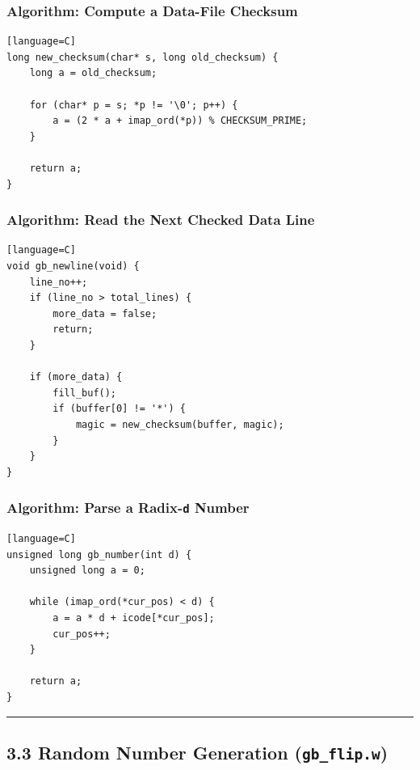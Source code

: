\documentclass[11pt]{article}
\begin{document}
\subsubsection{Algorithm: Compute a Data-File Checksum}\label{algorithm-compute-a-data-file-checksum}

\begin{verbatim}[language=C]
long new_checksum(char* s, long old_checksum) {
    long a = old_checksum;

    for (char* p = s; *p != '\0'; p++) {
        a = (2 * a + imap_ord(*p)) % CHECKSUM_PRIME;
    }

    return a;
}
\end{verbatim}

\subsubsection{Algorithm: Read the Next Checked Data Line}\label{algorithm-read-the-next-checked-data-line}

\begin{verbatim}[language=C]
void gb_newline(void) {
    line_no++;
    if (line_no > total_lines) {
        more_data = false;
        return;
    }

    if (more_data) {
        fill_buf();
        if (buffer[0] != '*') {
            magic = new_checksum(buffer, magic);
        }
    }
}
\end{verbatim}

\subsubsection{\texorpdfstring{Algorithm: Parse a Radix-\texttt{d} Number}{Algorithm: Parse a Radix-d Number}}\label{algorithm-parse-a-radix-d-number}

\begin{verbatim}[language=C]
unsigned long gb_number(int d) {
    unsigned long a = 0;

    while (imap_ord(*cur_pos) < d) {
        a = a * d + icode[*cur_pos];
        cur_pos++;
    }

    return a;
}
\end{verbatim}

\begin{center}\rule{0.5\linewidth}{0.5pt}\end{center}

\subsection{\texorpdfstring{3.3 Random Number Generation (\texttt{gb\_flip.w})}{3.3 Random Number Generation (gb\_flip.w)}}\label{random-number-generation-gb_flip.w}
\end{document}
